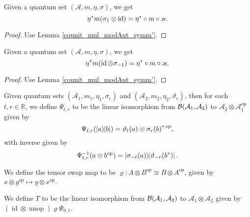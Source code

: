 \begin{corollary}\label{moving_twists}
  \leanok
  Given a quantum set $(\mathcal{A},m,\eta,\sigma)$, we get
  \[\eta^* m(\sigma_{1}\otimes\operatorname{id})=\eta^*\circ m\circ\varkappa.\]
 \end{corollary}
 \begin{proof}\leanok
  Use Lemma \ref{counit_mul_modAut_symm'}.
 \end{proof}
 \begin{corollary}\label{moving_twists_2}
  \leanok
  Given a quantum set $(\mathcal{A},m,\eta,\sigma)$, we get
  \[\eta^* m(\operatorname{id}\otimes\sigma_{-1})=\eta^*\circ m\circ\varkappa.\]
 \end{corollary}
 \begin{proof}\leanok
  Use Lemma \ref{counit_mul_modAut_symm'}.
 \end{proof}
 
 \begin{definition}\label{QuantumSet.Psi}
  \leanok
  Given quantum sets $(\mathcal{A}_1,m_1,\eta_1,\sigma_r)$ and $(\mathcal{A}_2,m_2,\eta_2,\vartheta_r)$, then for each $t,r\in\mathbb{R}$, we define $\Psi_{t,r}$ to be the linear isomorphism from $\mathcal{B}(\mathcal{A}_1,\mathcal{A}_2)$ to $\mathcal{A}_2\otimes\mathcal{A}_1^{\operatorname{op}}$ given by
  \[\Psi_{t,r}(\left\lvert a\right\rangle\!\!\left\langle b\right\rvert)=\vartheta_t(a)\otimes{\sigma_r(b)}^{*\operatorname{op}},\]
  with inverse given by
  \[\Psi_{t,r}^{-1}(a\otimes b^{\operatorname{op}})=\left\lvert\sigma_{-t}(a)\right\rangle\!\!\left\langle\vartheta_{-r}(b^*)\right\rvert.\]
 \end{definition}

 \begin{definition}\label{tenSwap}
  \leanok
  We define the tensor swap map to be $\varrho\colon A\otimes B^{\operatorname{op}}\cong B\otimes A^{\operatorname{op}}$, given by $x\otimes y^{\operatorname{op}}\mapsto y\otimes x^{\operatorname{op}}$.
 \end{definition}

 \begin{definition}\label{Upsilon}
  \leanok
  We define $\Upsilon$ to be the linear isomorphism from $\mathcal{B}(\mathcal{A}_1,\mathcal{A}_2)$ to $\mathcal{A}_1\otimes\mathcal{A}_2$ given by $(\operatorname{id}\otimes\operatorname{unop})\varrho\Psi_{0,1}$.
 \end{definition}

